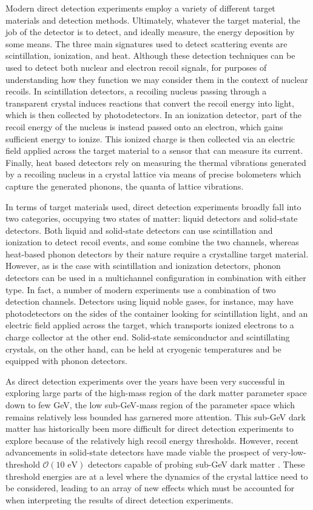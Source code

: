 Modern direct detection experiments employ a variety of different target materials and detection methods. Ultimately, whatever the target material, the job of the detector is to detect, and ideally measure, the energy deposition by some means. The three main signatures used to detect scattering events are scintillation, ionization, and heat. Although these detection techniques can be used to detect both nuclear and electron recoil signals, for purposes of understanding how they function we may consider them in the context of nuclear recoils. In scintillation detectors, a recoiling nucleus passing through a transparent crystal induces reactions that convert the recoil energy into light, which is then collected by photodetectors. In an ionization detector, part of the recoil energy of the nucleus is instead passed onto an electron, which gains sufficient energy to ionize. This ionized charge is then collected via an electric field applied across the target material to a sensor that can measure its current. Finally, heat based detectors rely on measuring the thermal vibrations generated by a recoiling nucleus in a crystal lattice via means of precise bolometers which capture the generated phonons, the quanta of lattice vibrations.

In terms of target materials used, direct detection experiments broadly fall into two categories, occupying two states of matter: liquid detectors and solid-state detectors. Both liquid and solid-state detectors can use scintillation and ionization to detect recoil events, and some combine the two channels, whereas heat-based phonon detectors by their nature require a crystalline target material. However, as is the case with scintillation and ionization detectors, phonon detectors can be used in a multichannel configuration in combination with either type. In fact, a number of modern experiments use a combination of two detection channels. Detectors using liquid noble gases, for instance, may have photodetectors on the sides of the container looking for scintillation light, and an electric field applied across the target, which transports ionized electrons to a charge collector at the other end. Solid-state semiconductor and scintillating crystals, on the other hand, can be held at cryogenic temperatures and be equipped with phonon detectors.

As direct detection experiments over the years have been very successful in exploring large parts of the high-mass region of the dark matter parameter space down to few GeV, the low sub-GeV-mass region of the parameter space which remains relatively less bounded has garnered more attention. This sub-GeV dark matter has historically been more difficult for direct detection experiments to explore because of the relatively high recoil energy thresholds. However, recent advancements in solid-state detectors have made viable the prospect of very-low-threshold $\mathcal{O}(\text{10 eV})$ detectors capable of probing sub-GeV dark matter \parencites{RomaniEtAl2018, CrislerEtAl2018, EDELWEISS2020}. These threshold energies are at a level where the dynamics of the crystal lattice need to be considered, leading to an array of new effects which must be accounted for when interpreting the results of direct detection experiments.

